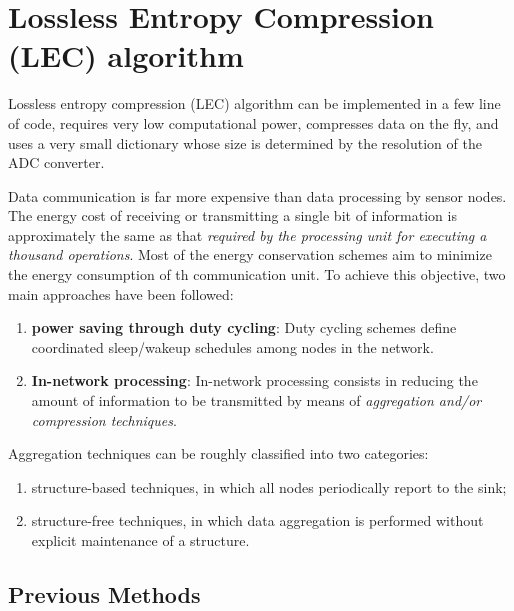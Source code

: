 \chapter{Lossless Entropy Compression (LEC) algorithm}

Lossless entropy compression (LEC) algorithm can be implemented in \textcolor[rgb]{1,0,0}{a few line of code}, requires \textcolor[rgb]{1,0,0}{very low computational power}, \textcolor[rgb]{1,0,0}{compresses data on the fly}, and \textcolor[rgb]{1,0,0}{uses a very small dictionary whose size is determined by the resolution of the ADC converter}. 

Data communication is far more expensive than data processing by sensor nodes. The energy cost of receiving or transmitting a single bit of information is approximately the same as that \emph{\textcolor[rgb]{1,0,0}{required by the processing unit for executing a thousand operations}}. Most of the energy conservation schemes aim to minimize the energy consumption of th communication unit. To achieve this objective, two main approaches have been followed:
\begin{enumerate}
    \item \textbf{\textcolor[rgb]{1,0,0}{power saving through duty cycling}}: Duty cycling schemes define coordinated sleep/wakeup schedules among nodes in the network. \cite{Anastasi2009}
    \item \textbf{\textcolor[rgb]{1,0,0}{In-network processing}}: In-network processing consists in reducing the amount of information to be transmitted by means of \emph{\textcolor[rgb]{1,0,0}{aggregation and/or compression techniques}}. 
\end{enumerate}

Aggregation techniques can be roughly classified into two categories: 
\begin{enumerate}
    \item structure-based techniques, in which all nodes periodically report to the sink;
    \item structure-free techniques, in which data aggregation is performed without explicit maintenance of a structure.
\end{enumerate}

\section{Previous Methods}

